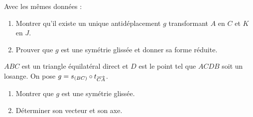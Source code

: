 \begin{annales}
Avec les mêmes données :
\begin{enumerate}[label=\textbf{\alph*)}, leftmargin=*, itemsep=0.15em]
  \item Montrer qu'il existe un unique antidéplacement $g$ transformant $A$ en
        $C$ et $K$ en $J$.
  \item Prouver que $g$ est une symétrie glissée et donner sa forme réduite.
\end{enumerate}

$ABC$ est un triangle équilatéral direct et $D$ est le point tel que $ACDB$
soit un losange. On pose $g = s_{(BC)} \circ t_{\overrightarrow{CA}}$.
\begin{enumerate}[label=\textbf{\alph*)}, leftmargin=*, itemsep=0.15em]
  \item Montrer que $g$ est une symétrie glissée.
  \item Déterminer son vecteur et son axe.
\end{enumerate}
\end{annales}

